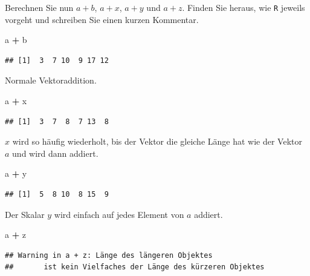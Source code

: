 \documentclass[12pt,a4paper]{article}
\newenvironment{Shaded}{\begin{snugshade}}{\end{snugshade}}
\newcommand{\NormalTok}[1]{#1}
\newcommand{\SpecialCharTok}[1]{\textcolor[rgb]{0.81,0.36,0.00}{\textbf{#1}}}
\begin{document}
Berechnen Sie nun \(a+b\), \(a+x\), \(a+y\) und \(a+z\). Finden Sie
heraus, wie \texttt{R} jeweils vorgeht und schreiben Sie einen kurzen
Kommentar.

\begin{Shaded}
\begin{Highlighting}[]
\NormalTok{    a }\SpecialCharTok{+}\NormalTok{ b }
\end{Highlighting}
\end{Shaded}

\begin{verbatim}
## [1]  3  7 10  9 17 12
\end{verbatim}

Normale Vektoraddition.

\begin{Shaded}
\begin{Highlighting}[]
\NormalTok{    a }\SpecialCharTok{+}\NormalTok{ x}
\end{Highlighting}
\end{Shaded}

\begin{verbatim}
## [1]  3  7  8  7 13  8
\end{verbatim}

\(x\) wird so häufig wiederholt, bis der Vektor die gleiche Länge hat
wie der Vektor \(a\) und wird dann addiert.

\begin{Shaded}
\begin{Highlighting}[]
\NormalTok{    a }\SpecialCharTok{+}\NormalTok{ y}
\end{Highlighting}
\end{Shaded}

\begin{verbatim}
## [1]  5  8 10  8 15  9
\end{verbatim}

Der Skalar \(y\) wird einfach auf jedes Element von \(a\) addiert.

\begin{Shaded}
\begin{Highlighting}[]
\NormalTok{    a }\SpecialCharTok{+}\NormalTok{ z}
\end{Highlighting}
\end{Shaded}

\begin{verbatim}
## Warning in a + z: Länge des längeren Objektes
##       ist kein Vielfaches der Länge des kürzeren Objektes
\end{verbatim}
\end{document}
